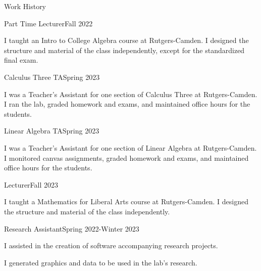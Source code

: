 \documentclass{resume} %
\begin{document}
\begin{rSection}{Work History}
\begin{rSubsection}{Part Time Lecturer}{Fall 2022}{}{}
\item I taught an Intro to College Algebra course at Rutgers-Camden. I designed the structure and material of the class independently, except for the standardized final exam.
\end{rSubsection}

\begin{rSubsection}{Calculus Three TA}{Spring 2023}{}{}
\item I was a Teacher's Assistant for one section of Calculus Three at Rutgers-Camden. I ran the lab, graded homework and exams, and maintained office hours for the students.
\end{rSubsection}

\begin{rSubsection}{Linear Algebra TA}{Spring 2023}{}{}
\item I was a Teacher's Assistant for one section of Linear Algebra at Rutgers-Camden. I monitored canvas assignments, graded homework and exams, and maintained office hours for the students.
\end{rSubsection}

\begin{rSubsection}{Lecturer}{Fall 2023}{}{}
\item I taught a Mathematics for Liberal Arts course at Rutgers-Camden. I designed the structure and material of the class independently.
\end{rSubsection}

\begin{rSubsection}{Research Assistant}{Spring 2022-Winter 2023}{}{}
\item I assisted in the creation of software accompanying research projects.
\item I generated graphics and data to be used in the lab's research.
\end{rSubsection}


\end{rSection} 
\end{document}
